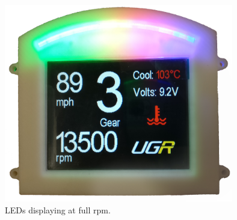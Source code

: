 \begin{figure}[H]
\begin{center}
\includegraphics[width=10cm]{Figures/full_leds.png}
\end{center}
\caption{LEDs displaying at full rpm.}
\label{fig:full_leds}
\end{figure}
